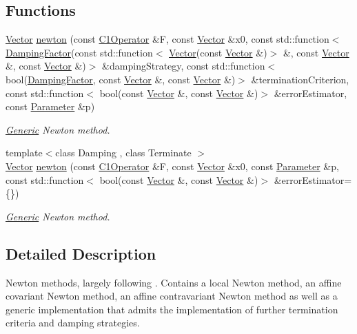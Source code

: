 \subsection*{Functions}
\begin{DoxyCompactItemize}
\item 
\hyperlink{classSpacy_1_1Vector}{Vector} \hyperlink{namespaceSpacy_1_1Newton_a3f15c7f2f703c971382e2a3f17fd5391}{newton} (const \hyperlink{classSpacy_1_1C1Operator}{C1\-Operator} \&F, const \hyperlink{classSpacy_1_1Vector}{Vector} \&x0, const std\-::function$<$ \hyperlink{classSpacy_1_1DampingFactor}{Damping\-Factor}(const std\-::function$<$ \hyperlink{classSpacy_1_1Vector}{Vector}(const \hyperlink{classSpacy_1_1Vector}{Vector} \&)$>$ \&, const \hyperlink{classSpacy_1_1Vector}{Vector} \&, const \hyperlink{classSpacy_1_1Vector}{Vector} \&)$>$ \&damping\-Strategy, const std\-::function$<$ bool(\hyperlink{classSpacy_1_1DampingFactor}{Damping\-Factor}, const \hyperlink{classSpacy_1_1Vector}{Vector} \&, const \hyperlink{classSpacy_1_1Vector}{Vector} \&)$>$ \&termination\-Criterion, const std\-::function$<$ bool(const \hyperlink{classSpacy_1_1Vector}{Vector} \&, const \hyperlink{classSpacy_1_1Vector}{Vector} \&)$>$ \&error\-Estimator, const \hyperlink{structSpacy_1_1Newton_1_1Parameter}{Parameter} \&p)
\begin{DoxyCompactList}\small\item\em \hyperlink{namespaceSpacy_1_1Generic}{Generic} Newton method. \end{DoxyCompactList}\item 
{\footnotesize template$<$class Damping , class Terminate $>$ }\\\hyperlink{classSpacy_1_1Vector}{Vector} \hyperlink{namespaceSpacy_1_1Newton_ae58104a160c7335748a9b800b2317c6d}{newton} (const \hyperlink{classSpacy_1_1C1Operator}{C1\-Operator} \&F, const \hyperlink{classSpacy_1_1Vector}{Vector} \&x0, const \hyperlink{structSpacy_1_1Newton_1_1Parameter}{Parameter} \&p, const std\-::function$<$ bool(const \hyperlink{classSpacy_1_1Vector}{Vector} \&, const \hyperlink{classSpacy_1_1Vector}{Vector} \&)$>$ \&error\-Estimator=\{\})
\begin{DoxyCompactList}\small\item\em \hyperlink{namespaceSpacy_1_1Generic}{Generic} Newton method. \end{DoxyCompactList}\end{DoxyCompactItemize}


\subsection{Detailed Description}
Newton methods, largely following \cite{Deuflhard2004}. Contains a local Newton method, an affine covariant Newton method, an affine contravariant Newton method as well as a generic implementation that admits the implementation of further termination criteria and damping strategies. 

